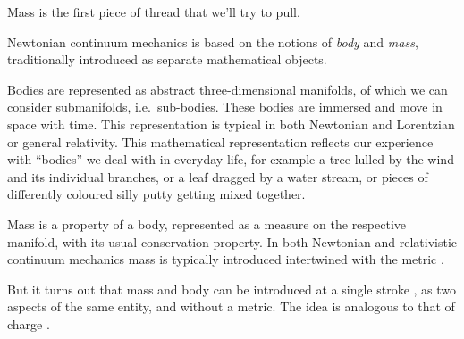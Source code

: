 \documentclass[\ifafour a4paper,12pt,\else a5paper,10pt,\fi%
onecolumn,oneside,article,%
british%
]{memoir}
\theoremstyle{remark}
\theoremstyle{innote}
\newcommand*{\citep}{\parencites}
\renewcommand*{\cites}{\parencites}
\renewcommand*{\|}{\nonscript\,\vert\nonscript\;\mathopen{}}
\newcommand*{\sect}{\S}%
\newcommand*{\sects}{\S\S}%
\newcommand*{\chap}{ch.}%
\newcommand*{\ie}{{i.e.}}
\newcommand*{\cf}{{cf.}}
\begin{document}
Mass is the first piece of thread that we'll try to pull.

\medskip

Newtonian continuum mechanics is based on the notions of \emph{body} and
\emph{mass}, traditionally introduced as separate mathematical objects.

Bodies are represented as abstract three-dimensional manifolds, of which we
can consider submanifolds, \ie\ sub-bodies. These bodies are immersed and
move in space with time. This representation is typical in both Newtonian
\cites[\sects~I.2--3]{truesdell1977_r1991}{noll1959,noll1973} and
Lorentzian or general \citep{grotetal1966,carteretal1972} relativity. This
mathematical representation reflects our experience with \enquote{bodies}
we deal with in everyday life, for example a tree lulled by the wind and
its individual branches, or a leaf dragged by a water stream, or pieces of
differently coloured silly putty getting mixed together.

Mass is a property of a body, represented as a measure on the respective
manifold, with its usual conservation property. In both Newtonian
\cites[\sects~I.4]{truesdell1977_r1991}{noll1959,noll1973} and relativistic
\cites{grotetal1966}[\chap~3]{rezzollaetal2013} continuum mechanics mass is
typically introduced intertwined with the metric \citep[being an
exception]{carteretal1972}.

But it turns out that mass and body can be introduced at a single stroke
\citep[\cf][]{carteretal1972}, as two aspects of the same entity, and
without a metric. The idea is analogous to that of charge
\cites{burke1983,bossavit1998b,hehletal2000}[\sect~B.1]{hehletal2003}.
\end{document}
